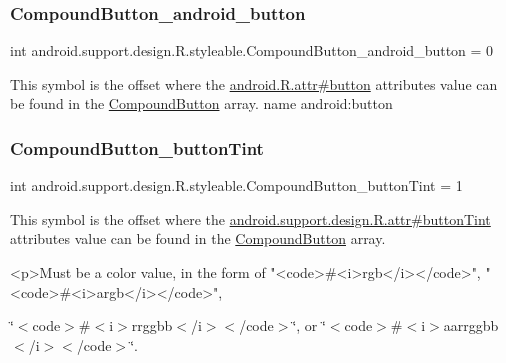 \subsubsection{\texorpdfstring{Compound\+Button\+\_\+android\+\_\+button}{CompoundButton\_android\_button}}
{\footnotesize\ttfamily int android.\+support.\+design.\+R.\+styleable.\+Compound\+Button\+\_\+android\+\_\+button = 0\hspace{0.3cm}{\ttfamily [static]}}

This symbol is the offset where the \hyperlink{}{android.\+R.\+attr\#button} attribute\textquotesingle{}s value can be found in the \hyperlink{classandroid_1_1support_1_1design_1_1R_1_1styleable_a1e3ef000b9dccc62673df5ec6d13a547}{Compound\+Button} array.  name android\+:button \mbox{\label{classandroid_1_1support_1_1design_1_1R_1_1styleable_adb51f0ae98fba003b81f70cc31d6d226}} 
\subsubsection{\texorpdfstring{Compound\+Button\+\_\+button\+Tint}{CompoundButton\_buttonTint}}
{\footnotesize\ttfamily int android.\+support.\+design.\+R.\+styleable.\+Compound\+Button\+\_\+button\+Tint = 1\hspace{0.3cm}{\ttfamily [static]}}

This symbol is the offset where the \hyperlink{classandroid_1_1support_1_1design_1_1R_1_1attr_ad8dc41dd7bb0cb9f98da77fc78f0c9a2}{android.\+support.\+design.\+R.\+attr\#button\+Tint} attribute\textquotesingle{}s value can be found in the \hyperlink{classandroid_1_1support_1_1design_1_1R_1_1styleable_a1e3ef000b9dccc62673df5ec6d13a547}{Compound\+Button} array.

\begin{DoxyVerb}      <p>Must be a color value, in the form of "<code>#<i>rgb</i></code>", "<code>#<i>argb</i></code>",
\end{DoxyVerb}
 \char`\"{}$<$code$>$\#$<$i$>$rrggbb$<$/i$>$$<$/code$>$\char`\"{}, or \char`\"{}$<$code$>$\#$<$i$>$aarrggbb$<$/i$>$$<$/code$>$\char`\"{}. 


